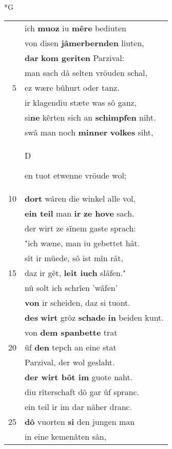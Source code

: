 \documentclass[8pt,a4paper,notitlepage]{article}
\begin{document}
\newpage
\begin{table}[ht]
\begin{minipage}[t]{0.5\linewidth}
\small
\begin{center}*G
\end{center}
\begin{tabular}{rl}
 & ich \textbf{muoz} iu \textbf{mêre} bediuten\\ 
 & von disen \textbf{jâmerbernden} liuten,\\ 
 & \textbf{dar} \textbf{kom geriten} Parzival:\\ 
 & man sach dâ selten vröuden schal,\\ 
5 & ez wære bûhurt oder tanz.\\ 
 & ir klagendiu stæte was sô ganz,\\ 
 & si\textbf{ne} kêrten sich an \textbf{schimpfen} niht.\\ 
 & swâ man noch \textbf{minner} \textbf{volkes} siht,\\ 
 & \begin{large}D\end{large}en tuot etwenne vröude wol;\\ 
10 & \textbf{dort} wâren die winkel alle vol,\\ 
 & \textbf{ein teil} man \textbf{ir} \textbf{ze hove} sach.\\ 
 & der wirt ze sînem gaste sprach:\\ 
 & "ich wæne, man iu gebettet hât.\\ 
 & sît ir müede, sô ist mîn rât,\\ 
15 & daz ir gêt, \textbf{leit iuch} slâfen."\\ 
 & nû solt ich schrîen 'wâfen'\\ 
 & \textbf{von} ir scheiden, daz si tuont.\\ 
 & \textbf{des} \textbf{wirt} grôz \textbf{schade} \textbf{in} beiden kunt.\\ 
 & von \textbf{dem spanbette} trat\\ 
20 & ûf \textbf{den} tepch an eine stat\\ 
 & Parzival, der wol geslaht.\\ 
 & \textbf{der wirt bôt im} guote naht.\\ 
 & diu rîterschaft dô gar ûf spranc.\\ 
 & ein teil ir im dar nâher dranc.\\ 
25 & \textbf{dô} vuorten \textbf{si} den jungen man\\ 
 & in eine kemenâten sân,\\ 

\end{tabular}
\end{minipage}
\end{table}
\end{document}
